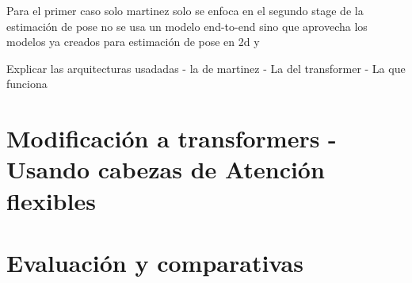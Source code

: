Para el primer caso solo martinez solo se enfoca en el segundo stage de la estimación de pose
no se usa un modelo end-to-end sino que aprovecha los modelos ya creados para estimación de pose
en 2d y

Explicar las arquitecturas usadadas
- la de martinez
- La del transformer
- La que funciona

\section{Modificación a transformers - Usando cabezas de Atención flexibles}

\section{Evaluación y comparativas}
